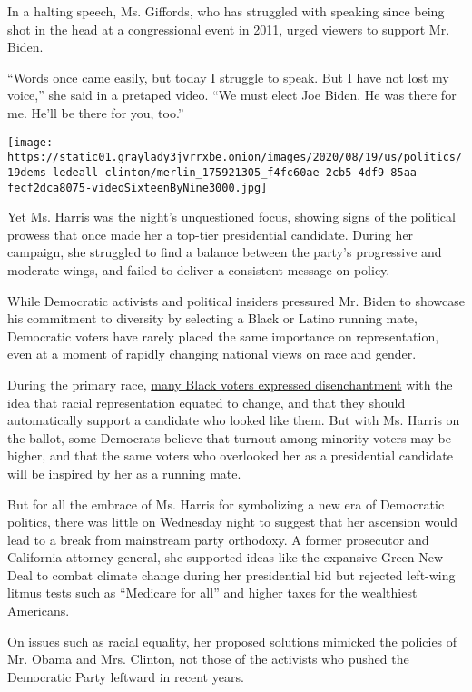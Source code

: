 In a halting speech, Ms. Giffords, who has struggled with speaking since
being shot in the head at a congressional event in 2011, urged viewers
to support Mr. Biden.

``Words once came easily, but today I struggle to speak. But I have not
lost my voice,'' she said in a pretaped video. ``We must elect Joe
Biden. He was there for me. He'll be there for you, too.''

\texttt{[image: https://static01.graylady3jvrrxbe.onion/images/2020/08/19/us/politics/19dems-ledeall-clinton/merlin\_175921305\_f4fc60ae-2cb5-4df9-85aa-fecf2dca8075-videoSixteenByNine3000.jpg]}

Yet Ms. Harris was the night's unquestioned focus, showing signs of the
political prowess that once made her a top-tier presidential candidate.
During her campaign, she struggled to find a balance between the party's
progressive and moderate wings, and failed to deliver a consistent
message on policy.

While Democratic activists and political insiders pressured Mr. Biden to
showcase his commitment to diversity by selecting a Black or Latino
running mate, Democratic voters have rarely placed the same importance
on representation, even at a moment of rapidly changing national views
on race and gender.

During the primary race,
\href{https://www.nytimes3xbfgragh.onion/2019/11/25/us/politics/2020-election-black-voters.html}{many
Black voters expressed disenchantment} with the idea that racial
representation equated to change, and that they should automatically
support a candidate who looked like them. But with Ms. Harris on the
ballot, some Democrats believe that turnout among minority voters may be
higher, and that the same voters who overlooked her as a presidential
candidate will be inspired by her as a running mate.

But for all the embrace of Ms. Harris for symbolizing a new era of
Democratic politics, there was little on Wednesday night to suggest that
her ascension would lead to a break from mainstream party orthodoxy. A
former prosecutor and California attorney general, she supported ideas
like the expansive Green New Deal to combat climate change during her
presidential bid but rejected left-wing litmus tests such as ``Medicare
for all'' and higher taxes for the wealthiest Americans.

On issues such as racial equality, her proposed solutions mimicked the
policies of Mr. Obama and Mrs. Clinton, not those of the activists who
pushed the Democratic Party leftward in recent years.

